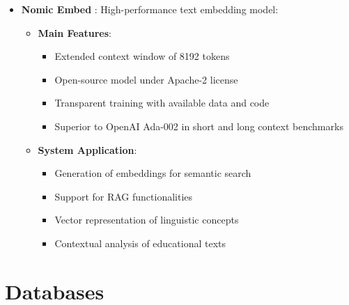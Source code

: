\begin{itemize}
	\item \textbf{Nomic Embed} \cite{nussbaum2024nomic}: High-performance text embedding model:
		\begin{itemize}
			\item \textbf{Main Features}:
				\begin{itemize}
				  \item Extended context window of 8192 tokens
				  \item Open-source model under Apache-2 license
				  \item Transparent training with available data and code
				  \item Superior to OpenAI Ada-002 in short and long context benchmarks
				\end{itemize}
			\item \textbf{System Application}:
				\begin{itemize}
				  \item Generation of embeddings for semantic search
				  \item Support for RAG functionalities
				  \item Vector representation of linguistic concepts
				  \item Contextual analysis of educational texts
				\end{itemize}
		\end{itemize}
\end{itemize}

\section{Databases}

